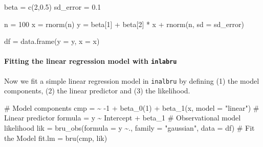\documentclass[
  letterpaper,
  DIV=11,
  numbers=noendperiod]{scrartcl}
\let\oldparagraph\paragraph
\renewcommand{\paragraph}[1]{\oldparagraph{#1}\mbox{}}
\newenvironment{Shaded}{\begin{snugshade}}{\end{snugshade}}
\newcommand{\AttributeTok}[1]{\textcolor[rgb]{0.40,0.45,0.13}{#1}}
\newcommand{\CommentTok}[1]{\textcolor[rgb]{0.37,0.37,0.37}{#1}}
\newcommand{\DecValTok}[1]{\textcolor[rgb]{0.68,0.00,0.00}{#1}}
\newcommand{\ErrorTok}[1]{\textcolor[rgb]{0.68,0.00,0.00}{#1}}
\newcommand{\FloatTok}[1]{\textcolor[rgb]{0.68,0.00,0.00}{#1}}
\newcommand{\FunctionTok}[1]{\textcolor[rgb]{0.28,0.35,0.67}{#1}}
\newcommand{\NormalTok}[1]{\textcolor[rgb]{0.00,0.23,0.31}{#1}}
\newcommand{\OtherTok}[1]{\textcolor[rgb]{0.00,0.23,0.31}{#1}}
\newcommand{\SpecialCharTok}[1]{\textcolor[rgb]{0.37,0.37,0.37}{#1}}
\newcommand{\StringTok}[1]{\textcolor[rgb]{0.13,0.47,0.30}{#1}}
\begin{document}
\begin{Shaded}
\begin{Highlighting}[]
\NormalTok{beta }\OtherTok{=} \FunctionTok{c}\NormalTok{(}\DecValTok{2}\NormalTok{,}\FloatTok{0.5}\NormalTok{)}
\NormalTok{sd\_error }\OtherTok{=} \FloatTok{0.1}

\NormalTok{n }\OtherTok{=} \DecValTok{100}
\NormalTok{x }\OtherTok{=} \FunctionTok{rnorm}\NormalTok{(n)}
\NormalTok{y }\OtherTok{=}\NormalTok{ beta[}\DecValTok{1}\NormalTok{] }\SpecialCharTok{+}\NormalTok{ beta[}\DecValTok{2}\NormalTok{] }\SpecialCharTok{*}\NormalTok{ x }\SpecialCharTok{+} \FunctionTok{rnorm}\NormalTok{(n, }\AttributeTok{sd =}\NormalTok{ sd\_error)}

\NormalTok{df }\OtherTok{=} \FunctionTok{data.frame}\NormalTok{(}\AttributeTok{y =}\NormalTok{ y, }\AttributeTok{x =}\NormalTok{ x)  }
\end{Highlighting}
\end{Shaded}

\paragraph{\texorpdfstring{\textbf{Fitting the linear regression model
with
\texttt{inlabru}}}{Fitting the linear regression model with inlabru}}\label{fitting-the-linear-regression-model-with-inlabru}

Now we fit a simple linear regression model in \texttt{inalbru} by
defining (1) the model components, (2) the linear predictor and (3) the
likelihood.

\begin{Shaded}
\begin{Highlighting}[]
\CommentTok{\# Model components}
\NormalTok{cmp }\OtherTok{=}  \ErrorTok{\textasciitilde{}} \SpecialCharTok{{-}}\DecValTok{1} \SpecialCharTok{+} \FunctionTok{beta\_0}\NormalTok{(}\DecValTok{1}\NormalTok{) }\SpecialCharTok{+} \FunctionTok{beta\_1}\NormalTok{(x, }\AttributeTok{model =} \StringTok{"linear"}\NormalTok{)}
\CommentTok{\# Linear predictor}
\NormalTok{formula }\OtherTok{=}\NormalTok{ y }\SpecialCharTok{\textasciitilde{}}\NormalTok{ Intercept }\SpecialCharTok{+}\NormalTok{ beta\_1}
\CommentTok{\# Observational model likelihood}
\NormalTok{lik }\OtherTok{=}  \FunctionTok{bru\_obs}\NormalTok{(}\AttributeTok{formula =}\NormalTok{ y }\SpecialCharTok{\textasciitilde{}}\NormalTok{.,}
            \AttributeTok{family =} \StringTok{"gaussian"}\NormalTok{,}
            \AttributeTok{data =}\NormalTok{ df)}
\CommentTok{\# Fit the Model}
\NormalTok{fit.lm }\OtherTok{=} \FunctionTok{bru}\NormalTok{(cmp, lik)}
\end{Highlighting}
\end{Shaded}
\end{document}
